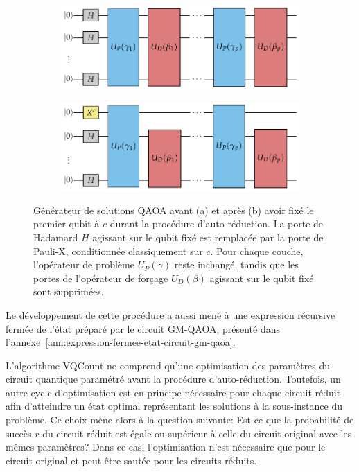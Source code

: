 \begin{figure}[h!]
    \centering
    \begin{subfigure}[h]{0.6\textwidth}
        \centering
        \caption{}
        \includegraphics[width=1\textwidth]{figures/qaoa-self-reducibility-1.pdf}
        \label{fig:vqcount-circuit-a}
    \end{subfigure}
    \begin{subfigure}[h]{0.6\textwidth}
        \centering
        \caption{}
        \includegraphics[width=1\textwidth]{figures/qaoa-self-reducibility-2.pdf}
        \label{fig:vqcount-circuit-b}
    \end{subfigure}
    \caption[Procédure d'auto-réduction de VQCount]{Générateur de solutions QAOA avant (a) et après (b) avoir fixé le premier qubit à $c$ durant la procédure d'auto-réduction. La porte de Hadamard $H$ agissant sur le qubit fixé est remplacée par la porte de Pauli-X, conditionnée classiquement sur $c$. Pour chaque couche, l'opérateur de problème $U_{P}(\gamma)$ reste inchangé, tandis que les portes de l'opérateur de forçage $U_{D}(\beta)$ agissant sur le qubit fixé sont supprimées.}
    \label{fig:vqcount-circuit} 
\end{figure}

Le développement de cette procédure a aussi mené à une expression récursive fermée de l'état préparé par le circuit GM-QAOA, présenté dans l'annexe~\ref{ann:expression-fermee-etat-circuit-gm-qaoa}.

L'algorithme VQCount ne comprend qu'une optimisation des paramètres du circuit quantique paramétré avant la procédure d'auto-réduction. Toutefois, un autre cycle d'optimisation est en principe nécessaire pour chaque circuit réduit afin d'atteindre un état optimal représentant les solutions à la sous-instance du problème. Ce choix mène alors à la question suivante: Est-ce que la probabilité de succès $r$ du circuit réduit est égale ou supérieur à celle du circuit original avec les mêmes paramètres? Dans ce cas, l'optimisation n'est nécessaire que pour le circuit original et peut être sautée pour les circuits réduits.

